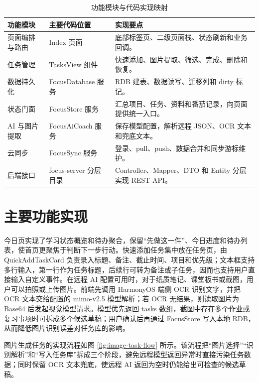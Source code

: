 \begin{table}[htbp]
\centering
\begingroup
\renewcommand{\arraystretch}{1.35}
\footnotesize
\caption{功能模块与代码实现映射}
\label{tab:module-code-map}
\begin{tabularx}{\textwidth}{p{2.8cm}p{3.0cm}X}
\toprule
功能模块 & 主要代码位置 & 实现要点 \\
\midrule
页面编排与路由 & Index 页面 & 底部标签页、二级页面栈、状态刷新和业务回调。 \\
任务管理 & TasksView 组件 & 快速添加、图片提取、筛选、完成、删除和恢复。 \\
数据持久化 & FocusDatabase 服务 & RDB 建表、数据读写、迁移列和 dirty 标记。 \\
状态门面 & FocusStore 服务 & 汇总项目、任务、资料和番茄记录，向页面提供统一入口。 \\
AI 与图片提取 & FocusAiCoach 服务 & 保存模型配置，解析远程 JSON、OCR 文本和兜底文本。 \\
云同步 & FocusSync 服务 & 登录、pull、push、数据合并和同步游标维护。 \\
后端接口 & focus-server 分层目录 & Controller、Mapper、DTO 和 Entity 分层实现 REST API。 \\
\bottomrule
\end{tabularx}
\endgroup
\end{table}

\section{主要功能实现}

今日页实现了学习状态概览和待办聚合，保留“先做这一件”、今日进度和待办列表，使首页更聚焦于判断下一步行动。快速添加任务集中放在任务页，由 QuickAddTaskCard 负责录入标题、备注、截止时间、项目和优先级；文本框支持多行输入，第一行作为任务标题，后续行可转为备注或子任务，因而也支持用户直接输入自定义事件。在远程 AI 配置可用时，对于纸质笔记、课堂板书或截图，用户可以拍照或上传图片。前端先调用 HarmonyOS 端侧 OCR 识别文字，并把 OCR 文本交给配置的 mimo-v2.5 模型解析；若 OCR 无结果，则读取图片为 Base64 后发起视觉模型请求。模型优先返回 tasks 数组，截图中存在多个作业或复习事项时可拆成多个候选草稿；用户确认后再通过 FocusStore 写入本地 RDB，从而降低图片识别误差对任务库的影响。

图片生成任务的实现流程如图 \ref{fig:image-task-flow} 所示。该流程把“图片选择”“识别解析”和“写入任务库”拆成三个阶段，避免远程模型返回异常时直接污染任务数据；同时保留 OCR 文本兜底，使远程 AI 返回为空时仍能给出可检查的候选草稿。

